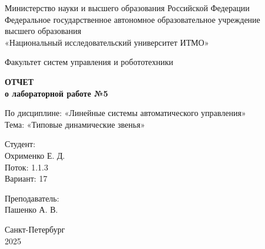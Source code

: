 \documentclass[a4paper,12pt]{article}
\begin{document}
	
	\begin{titlepage}
		\centering
		\vspace*{1cm}
		
		{\small
			Министерство науки и высшего образования Российской Федерации\\
			Федеральное государственное автономное образовательное учреждение\\
			высшего образования\\
			«Национальный исследовательский университет ИТМО»\\
		}
		
		\vspace{2cm}
		
		{\large
			Факультет систем управления и робототехники\\
		}
		
		\vspace{3cm}
		
		{\Huge\bfseries
			ОТЧЕТ\\
		}
		\vspace{0.5cm}
		{\LARGE\bfseries
			о лабораторной работе №5\\
		}
		
		\vspace{1cm}
		
		{\Large
			По дисциплине: «Линейные системы автоматического управления»\\
			\vspace{0.5cm}
			Тема: «Типовые динамические звенья»\\
		}
		
		\vspace{3cm}
		
		\begin{minipage}{0.4\textwidth}
			\raggedright
			{\large
				Студент:\\
			}
			Охрименко Е. Д.\\
			Поток: 1.1.3\\
			Вариант: 17\\
		\end{minipage}
		\hfill
		\begin{minipage}{0.4\textwidth}
			\raggedleft
			{\large
				Преподаватель:\\
			}
			Пашенко А. В.\\
		\end{minipage}
		
		\vfill
		
		{\large
			Санкт-Петербург\\
			2025\\
		}
		
	\end{titlepage}
	
\end{document}
